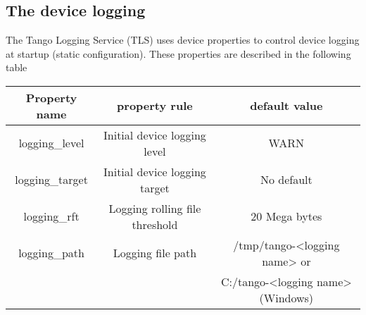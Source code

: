 \subsection{The device logging}

The Tango Logging Service (TLS) uses device properties to control
device logging at startup (static configuration). These properties
are described in the following table 

\vspace{0.3cm}

\begin{center}
\begin{longtable}{|c|c|c|}
\hline 
Property name & property rule & default value\tabularnewline
\hline 
\hline 
logging\_level & Initial device logging level & WARN\tabularnewline
\hline 
logging\_target & Initial device logging target & No default\tabularnewline
\hline 
logging\_rft & Logging rolling file threshold & 20 Mega bytes\tabularnewline
\hline 
logging\_path & Logging file path & \multicolumn{1}{c|}{/tmp/tango-<logging name> or}\tabularnewline
 &  & C:/tango-<logging name> (Windows)\tabularnewline
\hline 
\end{longtable}
\par\end{center}

\vspace{0.3cm}

